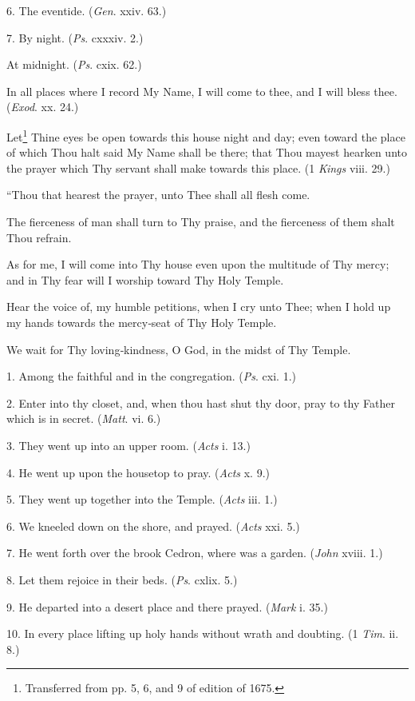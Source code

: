 6. The eventide. (\emph{Gen}. xxiv. 63.)

7. By night. (\emph{Ps}. cxxxiv. 2.)

At midnight. (\emph{Ps}. cxix. 62.)


In all places where I record My Name, I will come to thee, and I will bless thee. (\emph{Exod}. xx. 24.)

Let\footnote{Transferred from pp. 5, 6, and 9 of edition of 1675.} Thine eyes be open towards this house night and day; even toward the place of which Thou halt said My Name shall be there; that Thou mayest hearken unto the prayer which Thy servant shall make towards this place. (1 \emph{Kings} viii. 29.)

``Thou that hearest the prayer, unto Thee shall all flesh come.

The fierceness of man shall turn to Thy praise, and the fierceness of them shalt Thou refrain.

As for me, I will come into Thy house even upon the multitude of Thy mercy; and in Thy fear will I worship toward Thy Holy Temple.

Hear the voice of, my humble petitions, when I cry unto Thee; when I hold up my hands towards the mercy‑seat of Thy Holy Temple.

We wait for Thy loving‑kindness, O God, in the midst of Thy Temple.

1. Among the faithful and in the congregation. (\emph{Ps}. cxi. 1.)

2. Enter into thy closet, and, when thou hast shut thy door, pray to thy Father which is in secret. (\emph{Matt}. vi. 6.)

3. They went up into an upper room. (\emph{Acts} i. 13.)

4. He went up upon the housetop to pray. (\emph{Acts} x. 9.)

5. They went up together into the Temple. (\emph{Acts} iii. 1.)

6. We kneeled down on the shore, and prayed. (\emph{Acts} xxi. 5.)

7. He went forth over the brook Cedron, where was a garden. (\emph{John }xviii. 1.)

8. Let them rejoice in their beds. (\emph{Ps}. cxlix. 5.)

9. He departed into a desert place and there prayed. (\emph{Mark} i. 35.)

10. In every place lifting up holy hands without wrath and doubting. (1 \emph{Tim}. ii. 8.)

